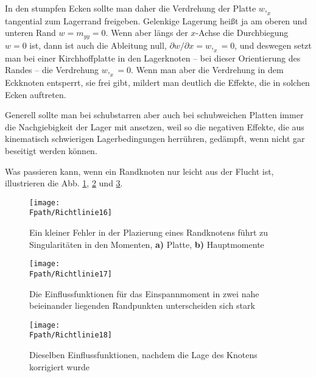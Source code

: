 In den stumpfen Ecken sollte man daher die Verdrehung der Platte $w,_x$ tangential zum Lagerrand freigeben. Gelenkige Lagerung hei{\ss}t ja am oberen und unteren Rand $w = m_{yy} = 0$. Wenn aber l\"{a}ngs der $x$-Achse die Durchbiegung $w = 0$ ist, dann ist auch die Ableitung null, $\partial w/\partial x = w,_x = 0$, und deswegen setzt man bei einer Kirchhoffplatte in den Lagerknoten -- bei dieser Orientierung des Randes -- die Verdrehung $w,_x = 0$. Wenn man aber die Verdrehung in dem Eckknoten entsperrt, sie frei gibt, mildert man deutlich die Effekte, die in solchen Ecken auftreten.


Generell sollte man bei schubstarren aber auch bei schubweichen Platten immer die Nachgiebigkeit der Lager mit ansetzen, weil so die negativen Effekte, die aus kinematisch schwierigen Lagerbedingungen herr\"{u}hren, ged\"{a}mpft, wenn nicht gar beseitigt werden k\"{o}nnen.

Was passieren kann, wenn ein Randknoten nur leicht aus der Flucht ist, illustrieren die Abb. \ref{Richtlinie16},
\ref{Richtlinie17} und \ref{Richtlinie18}.
\begin{figure}
\centering
{\texttt{[image: \\Fpath/Richtlinie16]}}
\caption{Ein kleiner Fehler in der Plazierung eines Randknotens f\"{u}hrt zu Singularit\"{a}ten in den Momenten, \textbf{ a)} Platte, \textbf{ b)} Hauptmomente}
\label{Richtlinie16}%
%
\end{figure}%

\begin{figure}
\centering
{\texttt{[image: \\Fpath/Richtlinie17]}}
\caption{Die Einflussfunktionen f\"{u}r das Einspannmoment in zwei nahe beieinander liegenden Randpunkten unterscheiden sich stark}
\label{Richtlinie17}%
%
\end{figure}%
\begin{figure}
\centering
{\texttt{[image: \\Fpath/Richtlinie18]}}
\caption{Dieselben Einflussfunktionen, nachdem die Lage des Knotens korrigiert wurde}
\label{Richtlinie18}%
%
\end{figure}%


